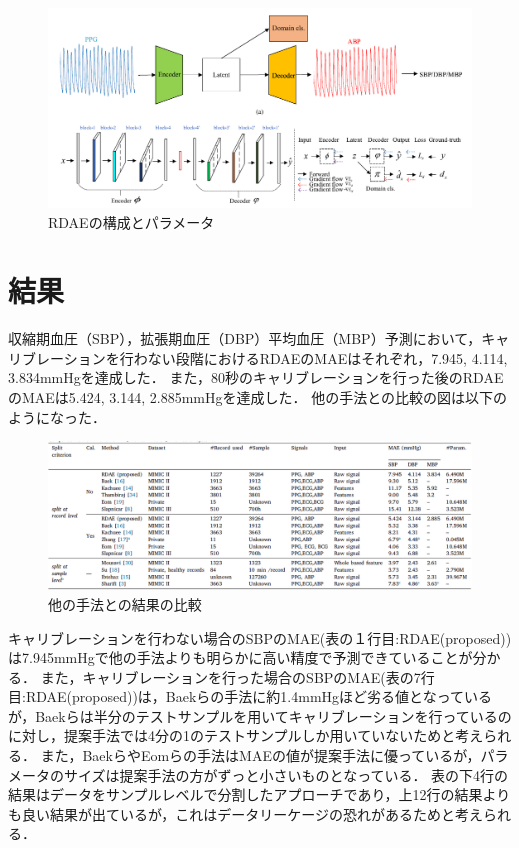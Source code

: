 \documentclass[dvipdfmx]{jsarticle}
\begin{document}
\begin{figure}[htbp]
\begin{center}
\includegraphics[width=\linewidth]{./rdae_model.png}
\end{center}
\caption{RDAEの構成とパラメータ}
\end{figure}
\section{結果}
収縮期血圧（SBP），拡張期血圧（DBP）平均血圧（MBP）予測において，キャリブレーションを行わない段階におけるRDAEのMAEはそれぞれ，7.945, 4.114, 3.834mmHgを達成した．
また，80秒のキャリブレーションを行った後のRDAEのMAEは5.424, 3.144, 2.885mmHgを達成した．
他の手法との比較の図は以下のようになった．
\begin{figure}[htbp]
\begin{center}
\includegraphics[width=\linewidth]{./result_comparison_with_other_system.png}
\end{center}
\caption{他の手法との結果の比較}
\end{figure}

キャリブレーションを行わない場合のSBPのMAE(表の１行目:RDAE(proposed))は7.945mmHgで他の手法よりも明らかに高い精度で予測できていることが分かる．
また，キャリブレーションを行った場合のSBPのMAE(表の7行目:RDAE(proposed))は，Baekらの手法に約1.4mmHgほど劣る値となっているが，Baekらは半分のテストサンプルを用いてキャリブレーションを行っているのに対し，提案手法では4分の1のテストサンプルしか用いていないためと考えられる．
また，BaekらやEomらの手法はMAEの値が提案手法に優っているが，パラメータのサイズは提案手法の方がずっと小さいものとなっている．
表の下4行の結果はデータをサンプルレベルで分割したアプローチであり，上12行の結果よりも良い結果が出ているが，これはデータリーケージの恐れがあるためと考えられる．
\end{document}
